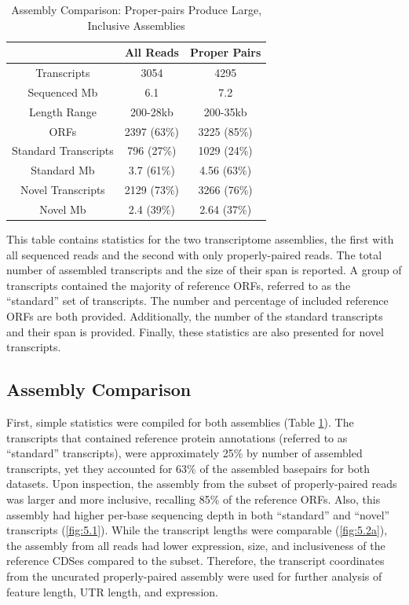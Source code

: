 \begin{table}
\begin{center}
\begin{tabular}{|c|c|c|}\hline
  & All Reads & Proper Pairs\\\hline\hline
Transcripts & 3054 & 4295\\\hline
Sequenced Mb & 6.1 & 7.2\\\hline
Length Range & 200-28kb & 200-35kb\\\hline
ORFs & 2397 (63\%) & 3225 (85\%)\\\hline
Standard Transcripts & 796 (27\%) & 1029 (24\%)\\\hline
Standard Mb & 3.7 (61\%) & 4.56 (63\%)\\\hline
Novel Transcripts & 2129 (73\%) & 3266 (76\%)\\\hline
Novel Mb & 2.4 (39\%)& 2.64 (37\%)\\\hline
\end{tabular}
\end{center}
\caption{Assembly Comparison: Proper-pairs Produce Large, Inclusive Assemblies}\label{table:assemb_compare}
\small
This table contains statistics for the two transcriptome assemblies, the first with all sequenced reads and the second with only properly-paired reads. The total number of assembled transcripts and the size of their span is reported. A group of transcripts contained the majority of reference ORFs, referred to as the ``standard'' set of transcripts. The number and percentage of included reference ORFs are both provided. Additionally, the number of the standard transcripts and their span is provided. Finally, these statistics are also presented for novel transcripts.
\end{table}

\subsection{Assembly Comparison}
First, simple statistics were compiled for both assemblies (Table \ref{table:assemb_compare}). The transcripts that contained reference protein annotations (referred to as ``standard'' transcripts), were approximately 25\% by number of assembled transcripts, yet they accounted for 63\% of the assembled basepairs for both datasets. Upon inspection, the assembly from the subset of properly-paired reads was larger and more inclusive, recalling 85\% of the reference ORFs. Also, this assembly had higher per-base sequencing depth in both ``standard'' and ``novel'' transcripts (\ref{fig:5.1}). While the transcript lengths were comparable (\ref{fig:5.2a}), the assembly from all reads had lower expression, size, and inclusiveness of the reference CDSes compared to the subset. Therefore, the transcript coordinates from the uncurated properly-paired assembly were used for further analysis of feature length, UTR length, and expression.




